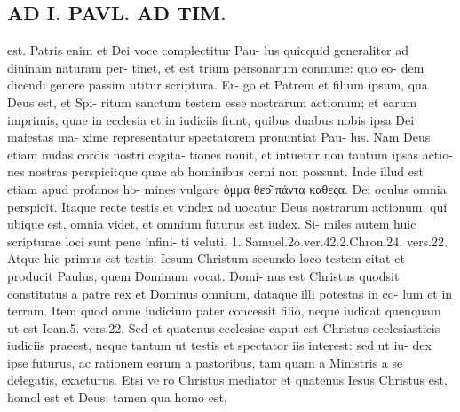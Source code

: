 \documentclass{article}
\begin{document}
\begin{pages}
\section*{AD I. PAVL. AD TIM. }
\marginpar{[ p. ]}est. Patris enim et Dei voce complectitur Pau- lus quicquid generaliter ad diuinam naturam per- tinet, et est trium personarum conmune: quo eo- dem dicendi genere passim utitur scriptura. Er- go et Patrem et filium ipsum, qua Deus est, et Spi- ritum sanctum testem esse nostrarum actionum; et earum imprimis, quae in ecclesia et in iudiciis fiunt, quibus duabus nobis ipsa Dei maiestas ma- xime representatur spectatorem pronuntiat Pau- lus. Nam Deus etiam nudas cordis nostri cogita- tiones nouit, et intuetur non tantum ipsas actio- nes nostras perspicitque quae ab hominibus cerni non possunt. Inde illud est etiam apud profanos ho- mines vulgare ὁμμα θεο͂ πάντα καθεςα. Dei oculus omnia perspicit. Itaque recte testis et vindex ad uocatur Deus nostrarum actionum. qui ubique est, omnia videt, et omnium futurus est iudex. Si- miles autem huic scripturae loci sunt pene infini- ti veluti, 1. Samuel.2o.ver.42.2.Chron.24. vers.22. Atque hic primus est testis. Iesum Christum secundo loco testem citat et producit Paulus, quem Dominum vocat. Domi- nus est Christus quodsit constitutus a patre rex et Dominus omnium, dataque illi potestas in co- lum et in terram. Item quod omne iudicium pater concessit filio, neque iudicat quenquam ut est Ioan.5. vers.22. Sed et quatenus ecclesiae caput est Christus ecclesiasticis iudiciis praeest, neque tantum ut testis et spectator iis interest: sed ut iu- dex ipse futurus, ac rationem eorum a pastoribus, tam quam a Ministris a se delegatis, exacturus. Etsi ve ro Christus mediator et quatenus Iesus Christus est, homol est et Deus: tamen qua homo est, 

\end{pages}
\end{document}
